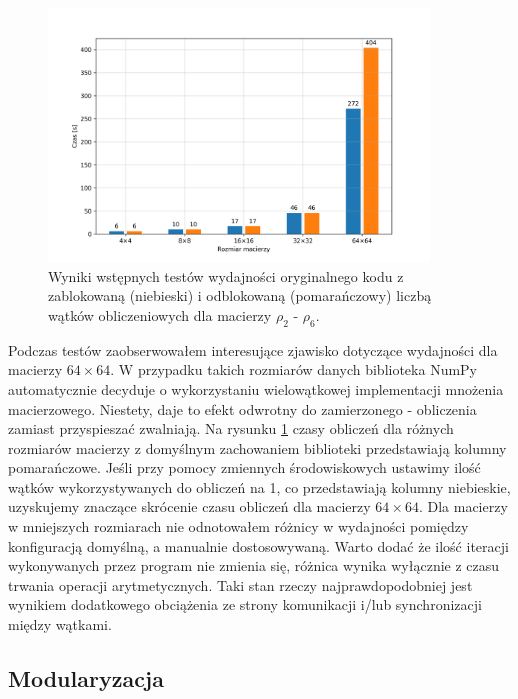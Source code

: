 \documentclass[10pt, a4paper]{article}
\begin{document}
\begin{sloppypar}
    \FloatBarrier
    \begin{figure}[ht]
      \centering
      \includegraphics[width=0.9\textwidth]{"resources/benchmark_1/plot.png"}
      \caption{Wyniki wstępnych testów wydajności oryginalnego kodu z zablokowaną (niebieski) i odblokowaną (pomarańczowy) liczbą wątków obliczeniowych dla macierzy $\rho
      _{2}$ - $\rho_{6}$.}
      \label{pre-perf}
    \end{figure}
    \FloatBarrier

    Podczas testów zaobserwowałem interesujące zjawisko dotyczące wydajności dla
    macierzy $64\times64$. W przypadku takich rozmiarów danych biblioteka NumPy automatycznie
    decyduje o wykorzystaniu wielowątkowej implementacji mnożenia macierzowego. Niestety,
    daje to efekt odwrotny do zamierzonego - obliczenia zamiast przyspieszać zwalniają.
    Na rysunku \ref{pre-perf} czasy obliczeń dla różnych rozmiarów macierzy z domyślnym
    zachowaniem biblioteki przedstawiają kolumny pomarańczowe. Jeśli przy pomocy zmiennych
    środowiskowych ustawimy ilość wątków wykorzystywanych do obliczeń na 1, co
    przedstawiają kolumny niebieskie, uzyskujemy znaczące skrócenie czasu obliczeń dla macierzy
    $64\times64$. Dla macierzy w mniejszych rozmiarach nie odnotowałem różnicy w
    wydajności pomiędzy konfiguracją domyślną, a manualnie dostosowywaną. Warto dodać że
    ilość iteracji wykonywanych przez program nie zmienia się, różnica wynika wyłącznie z
    czasu trwania operacji arytmetycznych. Taki stan rzeczy najprawdopodobniej jest
    wynikiem dodatkowego obciążenia ze strony komunikacji i/lub synchronizacji między
    wątkami.

    \subsection{Modularyzacja}



\end{sloppypar}
\end{document}
